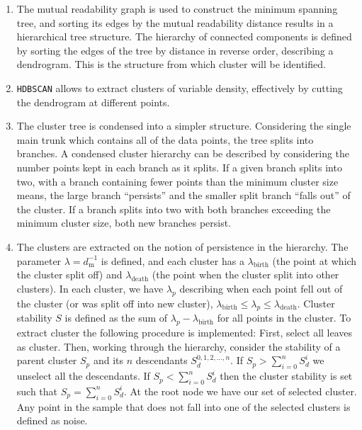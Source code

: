 \documentclass[fleqn,usenatbib]{mnras}
\begin{document}
{\begin{enumerate}
\item The mutual readability graph is used to construct the minimum spanning tree,
  and sorting its edges by the mutual readability distance results in a
  hierarchical tree structure. The hierarchy of connected components is
  defined by sorting the edges of the tree by distance in reverse order,
  describing a dendrogram. This is the structure from which cluster will
  be identified.

\item \texttt{HDBSCAN} allows to extract clusters of variable density, effectively
  by cutting the dendrogram at different points.

\item The cluster tree is condensed into a simpler structure. Considering the single
  main trunk which contains all of the data points, the tree splits into branches.
  A condensed cluster hierarchy can be described by considering the number points
  kept in each branch as it splits. If a given branch splits into two, with a branch
  containing fewer points than the minimum cluster size means, the large branch
  ``persists'' and the smaller split branch ``falls out'' of the  cluster. If
  a branch splits into two with both branches exceeding the minimum cluster size,
  both new branches persist.

\item The clusters are extracted on the notion of persistence in the hierarchy.
  The parameter $\lambda = d_{\mathrm{m}}^{-1}$ is defined, and each cluster has a
  $\lambda_{\mathrm{birth}}$ (the point at which the cluster split off) and
  $\lambda_{\mathrm{death}}$ (the point when the cluster split into other clusters).
  In each cluster, we have $\lambda_p$ describing when each point fell out of the
  cluster (or was split off into new cluster), $\lambda_{\mathrm{birth}} \leq \lambda_{p} \leq \lambda_{\mathrm{death}}$.
  Cluster stability  $S$ is defined as the sum of $\lambda_{p} - \lambda_{\mathrm{birth}}$
  for all points in the cluster. To extract cluster the following procedure is
  implemented: First, select all leaves as cluster. Then, working through the
  hierarchy, consider the stability of a parent cluster $S_p$ and its $n$ descendants
  $S_d^{0,1,2,...,n}$. If $S_p > \sum_{i=0}^{n} S_d^i$ we unselect all the descendants.
  If $S_p < \sum_{i=0}^{n} S_d^i$ then the cluster stability is set such that
  $S_p = \sum_{i=0}^{n} S_d^i$. At the root node we have our set of selected 
  cluster. Any point in the sample that does not fall into one of the selected
  clusters is defined as noise.


\end{enumerate}}
\end{document}
